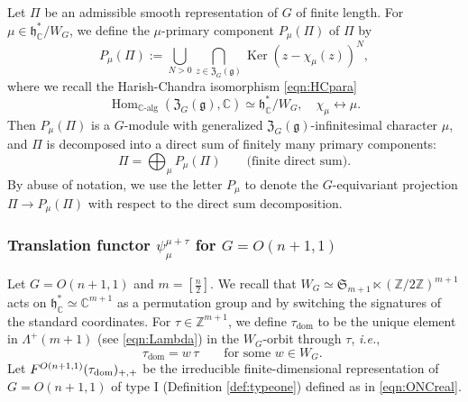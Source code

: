 Let $\Pi$ be an admissible smooth representation of $G$ of finite length.  
For $\mu \in {\mathfrak{h}}_{\mathbb{C}}^{\ast}/W_G$, 
 we define the $\mu$-primary component $P_{\mu}(\Pi)$ of $\Pi$ by 
\[
    P_{\mu}(\Pi) := \bigcup_{N >0} \bigcap_{z \in {\mathfrak{Z}}_G({\mathfrak{g}})}
   \operatorname{Ker}(z-\chi_{\mu}(z))^N, 
\]
where we recall the Harish-Chandra isomorphism \eqref{eqn:HCpara}
\[
   \operatorname{Hom}_{\mathbb{C}\text{-alg}}({\mathfrak{Z}}_G({\mathfrak{g}}), {\mathbb{C}})
   \simeq {\mathfrak{h}}_{\mathbb{C}}^{\ast}/W_G, 
\quad
   \chi_{\mu} \leftrightarrow \mu.  
\]
Then $P_{\mu}(\Pi)$ is a $G$-module with generalized ${\mathfrak{Z}}_G({\mathfrak{g}})$-infinitesimal character $\mu$, 
 and $\Pi$ is decomposed into a direct sum 
 of finitely many primary components:
\[
  \Pi = \bigoplus_{\mu}P_{\mu}(\Pi)
\qquad
\text{(finite direct sum)}.  
\]
By abuse of notation,
 we use the letter 
$P_{\mu}$ 
 to denote the $G$-equivariant projection $\Pi \to P_{\mu}(\Pi)$
 with respect to the direct sum decomposition.  



\subsubsection{Translation functor $\psi_{\mu}^{\mu+\tau}$
 for $G=O(n+1,1)$}
Let $G=O(n+1,1)$ and $m=[\frac n 2]$.  
We recall that $W_G \simeq {\mathfrak{S}}_{m+1} \ltimes ({\mathbb{Z}}/2{\mathbb{Z}})^{m+1}$
 acts on ${\mathfrak{h}}_{\mathbb{C}}^{\ast} \simeq {\mathbb{C}}^{m+1}$
 as a permutation group 
 and by switching the signatures of the standard coordinates.  
For $\tau \in {\mathbb{Z}}^{m+1}$, 
 we define 
$\tau_{\operatorname{dom}}$ to be the unique element
 in $\Lambda^+(m+1)$
 (see \eqref{eqn:Lambda})
 in the $W_G$-orbit through $\tau$, 
{\it{i.e.}}, 
\begin{equation}
\label{eqn:Wdom}
  \tau_{\operatorname{dom}}= w \, \tau
  \qquad
  \text{for some $w \in W_G$.  }
\end{equation}
Let $F^{{O(n+1,1)}}({\tau_{\operatorname{dom}}})_{+,+}$
 be the irreducible finite-dimensional representation of 
 $G=O(n+1,1)$ of type I 
 (Definition \ref{def:typeone})
 defined as in \eqref{eqn:ONCreal}.  



